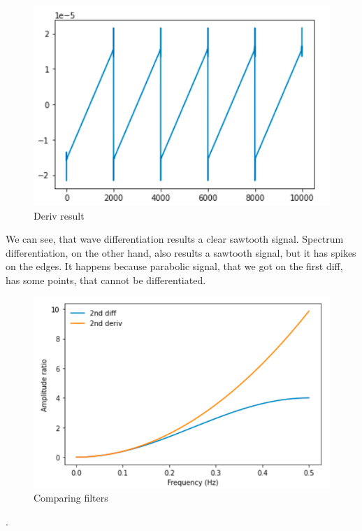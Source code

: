 \documentclass[a4paper]{article}
\begin{document}
        \begin{figure}[H]
            \centering
            \includegraphics[width=\textwidth]{img/p5_2.png}
            \caption{Deriv result}
            \label{fig:part1_1_2}
        \end{figure}
        
        We can see, that wave differentiation results a clear sawtooth signal. Spectrum differentiation, on the other hand, also results a sawtooth signal, but it has spikes on the edges. It happens because parabolic signal, that we got on the first diff, has some points, that cannot be differentiated.
        
        \begin{figure}[H]
            \centering
            \includegraphics[width=\textwidth]{img/p5_3.png}
            \caption{Comparing filters}
            \label{fig:part1_1_2}
        \end{figure}.
        
\end{document}
